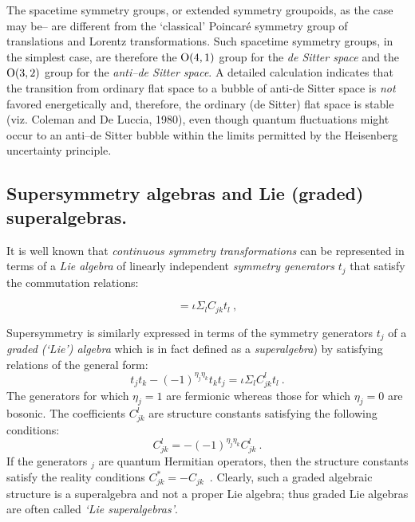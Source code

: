 \documentclass[12pt]{article}
\theoremstyle{plain}
\theoremstyle{definition}
\numberwithin{equation}{section}
\newcommand{\rO}{{\rm O}}
\newcommand{\med}{\medbreak}
\newcommand{\<}{{\langle}}
\begin{document}
\med
The spacetime symmetry groups, or extended symmetry groupoids, as the case may
be-- are different from the `classical' Poincar\'e symmetry group
of translations and Lorentz transformations. Such spacetime
symmetry groups, in the simplest case, are therefore the
$\rO(4,1)$ group for the \emph{de Sitter space} and the $\rO(3,2)$ group
for the \emph{anti--de Sitter space}. A detailed calculation indicates
that the transition from ordinary flat space to a bubble of
anti-de Sitter space is \emph{not} favored energetically and,
therefore, the ordinary (de Sitter) flat space is stable (viz.
Coleman and De Luccia, 1980), even though quantum fluctuations
might occur to an anti--de Sitter bubble within the limits
permitted by the Heisenberg uncertainty principle.

\subsection {Supersymmetry algebras and Lie (graded) superalgebras.}

It is well known that \emph{continuous symmetry transformations}
can be represented in terms of a \emph{Lie algebra} of linearly
independent \emph{symmetry generators} $t_j$ that satisfy the
commutation relations:

\begin{equation}
[t_j,t_k] = \iota \Sigma_l C_{jk} t_l ~,
\end{equation}

Supersymmetry is similarly expressed in terms of the symmetry
generators $t_j$ of a \textit{graded (`Lie') algebra} which is in
fact defined as a \textit{superalgebra}) by satisfying relations of the
general form:
\begin{equation}
t_j t_k - (-1)^{\eta _j \eta _k} t_k  t_j = \iota \Sigma_l C_{jk}
^l t_l ~.
\end{equation}
The generators for which $\eta _j =1$ are fermionic whereas those
for which $\eta _j =0$ are bosonic. The coefficients $C^l_{jk}$
are structure constants satisfying the following conditions:
\begin{equation}
C _{jk} ^l = -(-1)^{\eta _j \eta _k} C _{jk} ^l ~.
\end{equation}
If the generators $ _j$ are quantum Hermitian operators, then the
structure constants satisfy the reality conditions $C_{jk}^* = -
C_{jk}$~.  Clearly, such a graded algebraic structure is a superalgebra
and not a proper Lie algebra; thus graded Lie algebras are often called
\textit{`Lie superalgebras'}.
\end{document}
